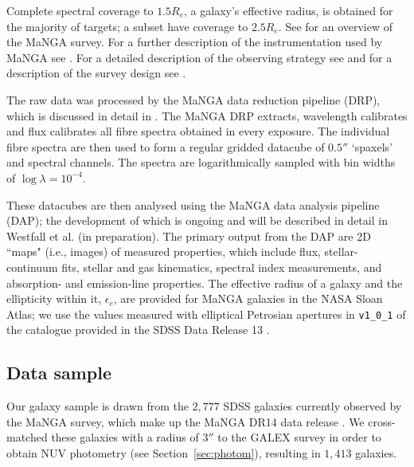 \documentclass[useAMS,usenatbib]{mn2e}
\begin{document}
Complete spectral coverage to $1.5 R_e$, a galaxy's effective radius, is obtained for the majority of targets; a subset have coverage to $2.5 R_e$. See \cite{bundy15} for an overview of the MaNGA survey. For a further description of the instrumentation used by MaNGA see \cite{drory15}. For a detailed description of the observing strategy see \cite{law15} and for a description of the survey design see \cite{yan16}. %

The raw data was processed by the MaNGA data reduction pipeline (DRP), which is discussed in detail in \cite{law16}. The MaNGA DRP extracts, wavelength calibrates and flux calibrates all fibre spectra obtained in every exposure. The individual fibre spectra are then used to form a regular gridded datacube of $0.5''$ ‘spaxels’ and spectral channels. The spectra are logarithmically sampled with bin widths of $\log{\lambda} = 10^{-4}$. 

These datacubes are then analysed using the MaNGA data analysis pipeline (DAP); the development of which is ongoing and will be described in detail in Westfall et al. (in preparation). The primary output from the DAP are 2D ``maps" (i.e., images) of measured properties, which include flux, stellar-continuum fits, stellar and gas kinematics, spectral index measurements, and absorption- and emission-line properties. The effective radius of a galaxy and the ellipticity within it, $\epsilon_e$, are provided for MaNGA galaxies in the NASA Sloan Atlas; we use the values measured with elliptical Petrosian apertures in {\tt v1\_0\_1} of the catalogue provided in the SDSS Data Release 13 \citep{albareti16}. 

\subsection{Data sample}\label{sec:mangasample}

Our galaxy sample is drawn from the $2,777$ SDSS galaxies currently observed by the MaNGA survey, which make up the MaNGA DR14 data release \citep{dr14}. We cross-matched these galaxies with a radius of $3''$ to the GALEX survey in order to obtain NUV photometry (see Section~\ref{sec:photom}), resulting in $1,413$ galaxies.
\end{document}
